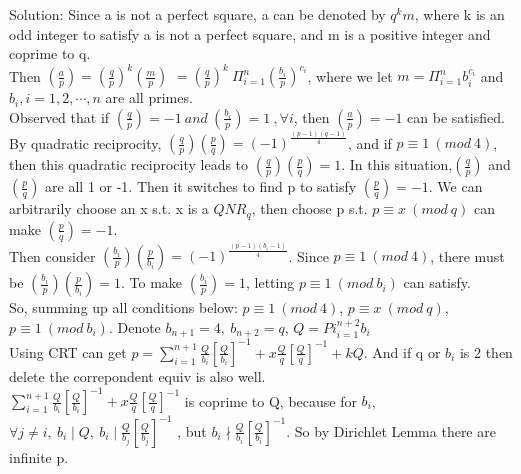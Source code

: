 \documentclass[UTF8]{ctexart}
\begin{document}
\begin{flushleft}
    \Large
    Solution:
    Since a is not a perfect square,
    a can be denoted by $q^k m$,
    where k is an odd integer to satisfy a is not a perfect square,
    and m is a positive integer and coprime to q.\\

    Then $(\frac{a}{p}) = (\frac{q}{p})^k (\frac{m}{p})$
    $=(\frac{q}{p})^k\ \Pi _{i=1}^{n} (\frac{b_i}{p}) ^ {c_i}$,
    where we let $m = \Pi _{i=1}^{n} b_i ^ {c_i}$ and
    $b_i , i=1,2,\cdots,n$ are all primes.\\

    Observed that if
    $(\frac{q}{p}) = -1\ and\ (\frac{b_i}{p}) = 1\ ,\forall i$,
    then $(\frac{a}{p}) = -1$ can be satisfied.\\

    By quadratic reciprocity,
    $(\frac{q}{p})(\frac{p}{q}) = (-1)^{\frac{(p-1)(q-1)}{4}}$,
    and if $p \equiv 1\ (mod\ 4)$, then this quadratic reciprocity leads to
    $(\frac{q}{p})(\frac{p}{q}) = 1$.
    In this situation,$(\frac{q}{p})$ and $(\frac{p}{q})$ are all 1 or -1.
    Then it switches to find p to satisfy $(\frac{p}{q}) = -1$.
    We can arbitrarily choose an x s.t. x is a $QNR_q$,
    then choose p s.t. $p \equiv x\ (mod\ q)$ can make $(\frac{p}{q}) = -1$.\\

    Then consider $(\frac{b_i}{p})(\frac{p}{b_i}) = (-1)^\frac{(p-1)(b_i-1)}{4}$.
    Since $p \equiv 1\ (mod\ 4)$, there must be $(\frac{b_i}{p})(\frac{p}{b_i}) = 1$.
    To make $(\frac{b_i}{p}) = 1$, letting $p \equiv 1\ (mod\ b_i)$ can satisfy.\\

    So, summing up all conditions below:
    $p \equiv 1\ (mod\ 4)$,
    $p \equiv x\ (mod\ q)$,
    $p \equiv 1\ (mod\ b_i)$.
    Denote $b_{n+1} = 4,\ b_{n+2} = q$,
    $Q = Pi _{i=1}^{n+2} b_i$\\
    Using CRT can get
    $p = \sum_{i=1}^{n+1} \frac{Q}{b_i}[\frac{Q}{b_i}]^{-1}
        + x\frac{Q}{q}[\frac{Q}{q}]^{-1} + kQ$.
    And if q or $b_i$ is 2 then delete the correpondent equiv is also well.\\
    $\sum_{i=1}^{n+1} \frac{Q}{b_i}[\frac{Q}{b_i}]^{-1}
        + x\frac{Q}{q}[\frac{Q}{q}]^{-1}$
    is coprime to Q, because for $b_i$,
    $\forall j\neq i,\ b_i \mid Q ,\ b_i \mid \frac{Q}{b_j}[\frac{Q}{b_j}]^{-1}$ ,
    but $b_i \nmid \frac{Q}{b_i}[\frac{Q}{b_i}]^{-1}$.
    So by Dirichlet Lemma there are infinite p.
\end{flushleft}
\end{document}
